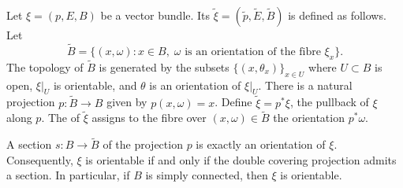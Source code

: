 Let $\xi = (p, E, B)$ be a vector bundle. Its  $\tilde{\xi} = (\tilde{p}, \tilde{E}, \tilde{B})$ is defined as follows. Let
$$\tilde{B} = \{(x, \omega) : x \in B,\; \omega \text{ is an orientation of the fibre } \xi_x\}.$$
The topology of $\tilde{B}$ is generated by the subsets $\{(x, \theta_x)\}_{x \in U}$ where $U \subset B$ is open, $\xi|_U$ is orientable, and $\theta$ is an orientation of $\xi|_U$. There is a natural projection $p: \tilde{B} \to B$ given by $p(x, \omega) = x$. Define $\tilde{\xi} = p^* \xi$, the pullback of $\xi$ along $p$. The  of $\tilde{\xi}$ assigns to the fibre over $(x, \omega) \in \tilde{B}$ the orientation $p^* \omega$.

A section $s: B \to \tilde{B}$ of the projection $p$ is exactly an orientation of $\xi$. Consequently, $\xi$ is orientable if and only if the double covering projection admits a section. In particular, if $B$ is simply connected, then $\xi$ is orientable.
